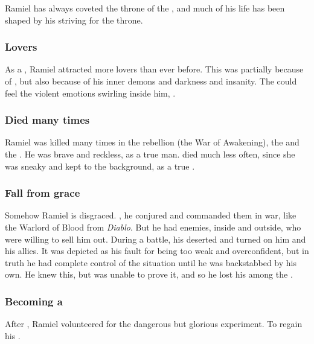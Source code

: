 Ramiel has always coveted the throne of the \Mystraacht{} \apex{}, and much of his life has been shaped by his striving for the throne. 





\subsubsection{Lovers}
As a \sathariah, Ramiel attracted more \resvil lovers than ever before.
This was partially because of , but also because of his inner demons and darkness and insanity.
The \resviel could feel the violent emotions swirling inside him, .






\subsubsection{Died many times}
Ramiel was killed many times in the rebellion (the War of Awakening), the \secondbanewar and the \resphanwars. 
He was brave and reckless, as a true \resphan man.
\Shiaraid died much less often, since she was sneaky and kept to the background, as a true \resvil.





\subsubsection{Fall from grace}
Somehow Ramiel is disgraced. 
, he conjured \daemons{} and commanded them in war, like the Warlord of Blood from \emph{Diablo}. 
But he had enemies, inside \Mystraacht{} and outside, who were willing to sell him out. 
During a battle, his \daemons{} deserted and turned on him and his allies. 
It was depicted as his fault for being too weak and overconfident, but in truth he had complete control of the situation until he was backstabbed by his own. 
He knew this, but was unable to prove it, and so he lost his \honour among the \resphain. 





\subsubsection{Becoming a \malach}
After , Ramiel volunteered for the dangerous but glorious \Malach{} experiment. 
To regain his \honour. 

